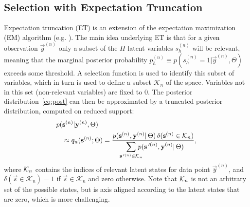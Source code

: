 %
%

\subsection{Selection with Expectation Truncation}
%
Expectation truncation (ET) is an extension of the expectation maximization (EM) algorithm (e.g. \citep{DempsterEtAl1977,
NealHinton1998}).
%
The main idea underlying ET is that for a given observation $\vec{y}^{(n)}$
only a subset of the $H$ latent variables $s_h^{(n)}$ will be relevant, meaning
that the marginal posterior probability $p^{(n)}_h \equiv p(s^{(n)}_h = 1|\vec{y}^{(n)}, \Theta)$
exceeds some threshold. 
A selection function is used to identify this subset
of variables, which in turn is used to define a subset $\mathcal{K}_n$ of the space. 
Variables not in this set (non-relevant variables) are fixed to 0.
%
The posterior distribution~\eqref{eq:post} can then be approximated by a truncated posterior distribution, computed on reduced support:
%
\vspace{-.1cm}
\begin{align}
\label{eq:sel-post}
p(&\vec{s}^{(n)}|\vec{y}^{(n)},\Theta) \nonumber\\
&\approx q_n(\vec{s}^{(n)};\Theta) = \frac{p(\vec{s}^{(n)},\vec{y}^{(n)}|\,\Theta) \,\delta(\vec{s}^{(n)}\in\hspace{-.05mm}\Kn)}
{\disS\hspace{-1.5mm}\sum_{\vec{s}\Prime^{(n)}\in\mathcal{K}_n}\hspace{-3mm} p(\vec{s}\Prime^{(n)},\vec{y}^{(n)}|\,\Theta)},
\end{align}
\normalsize
%
where $\mathcal{K}_{n}$ contains the indices of relevant latent states for data point
$\vec{y}^{(n)}$, and $\delta(\vec{s}\in\mathcal{K}_n)=1$ if
$\vec{s}\in\mathcal{K}_n$ and zero otherwise.
Note that $\mathcal{K}_{n}$ is not an arbitrary set of the possible states, but is axis aligned according to the latent states that are zero, which is more challenging. 


